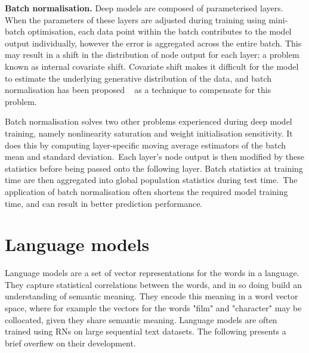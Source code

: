 \noindent \textbf{Batch normalisation.} Deep models are composed of parameterised layers. When the parameters of these layers are adjusted during training using mini-batch optimisation, each data point within the batch contributes to the model output individually, however the error is aggregated across the entire batch. This may result in a shift in the distribution of node output for each layer; a problem known as internal covariate shift. Covariate shift makes it difficult for the model to estimate the underlying generative distribution of the data, and batch normalisation has been proposed \unskip ~\citep{ioffe2015batch} as a technique to compensate for this problem. \par

\noindent Batch normalisation solves two other problems experienced during deep model training, namely nonlinearity saturation and weight initialisation sensitivity. It does this by computing layer-specific moving average estimators of the batch mean and standard deviation.\ Each layer's node output is then modified by these statistics before being passed onto the following layer. Batch statistics at training time are then aggregated into global population statistics during test time.\ The application of batch normalisation often shortens the required model training time, and can result in better prediction performance. 



\section{Language models}

\noindent Language models are a set of vector representations for the words in a language. They capture statistical correlations between the words, and in so doing build an understanding of semantic meaning. They encode this meaning in a word vector space, where for example the vectors for the words "film" and "character" may be collocated, given they share semantic meaning. Language models are often trained using RNs on large sequential text datasets. The following presents a brief overfiew on their development. \par

